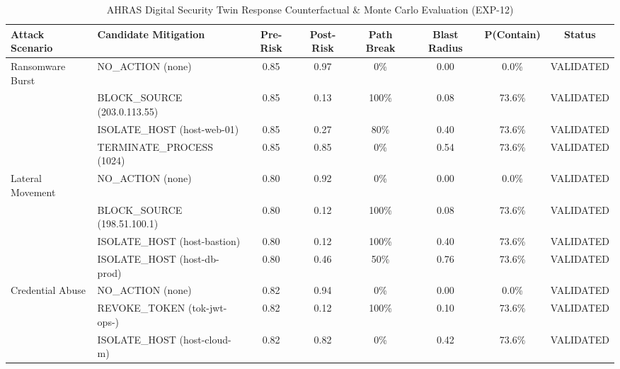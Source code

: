 \begin{table}[t]
\centering
\small
\caption{AHRAS Digital Security Twin Response Counterfactual \& Monte Carlo Evaluation (EXP-12)}
\label{tab:security_twin_eval}
\begin{tabular}{llcccccc}
\toprule
\textbf{Attack Scenario} & \textbf{Candidate Mitigation} & \textbf{Pre-Risk} & \textbf{Post-Risk} & \textbf{Path Break} & \textbf{Blast Radius} & \textbf{P(Contain)} & \textbf{Status} \\
\midrule
Ransomware Burst & NO_ACTION (none) & 0.85 & 0.97 & 0\% & 0.00 & 0.0\% & VALIDATED \\
 & BLOCK_SOURCE (203.0.113.55) & 0.85 & 0.13 & 100\% & 0.08 & 73.6\% & VALIDATED \\
 & ISOLATE_HOST (host-web-01) & 0.85 & 0.27 & 80\% & 0.40 & 73.6\% & VALIDATED \\
 & TERMINATE_PROCESS (1024) & 0.85 & 0.85 & 0\% & 0.54 & 73.6\% & VALIDATED \\
\midrule
Lateral Movement & NO_ACTION (none) & 0.80 & 0.92 & 0\% & 0.00 & 0.0\% & VALIDATED \\
 & BLOCK_SOURCE (198.51.100.1) & 0.80 & 0.12 & 100\% & 0.08 & 73.6\% & VALIDATED \\
 & ISOLATE_HOST (host-bastion) & 0.80 & 0.12 & 100\% & 0.40 & 73.6\% & VALIDATED \\
 & ISOLATE_HOST (host-db-prod) & 0.80 & 0.46 & 50\% & 0.76 & 73.6\% & VALIDATED \\
\midrule
Credential Abuse & NO_ACTION (none) & 0.82 & 0.94 & 0\% & 0.00 & 0.0\% & VALIDATED \\
 & REVOKE_TOKEN (tok-jwt-ops-) & 0.82 & 0.12 & 100\% & 0.10 & 73.6\% & VALIDATED \\
 & ISOLATE_HOST (host-cloud-m) & 0.82 & 0.82 & 0\% & 0.42 & 73.6\% & VALIDATED \\
\bottomrule
\end{tabular}
\end{table}
